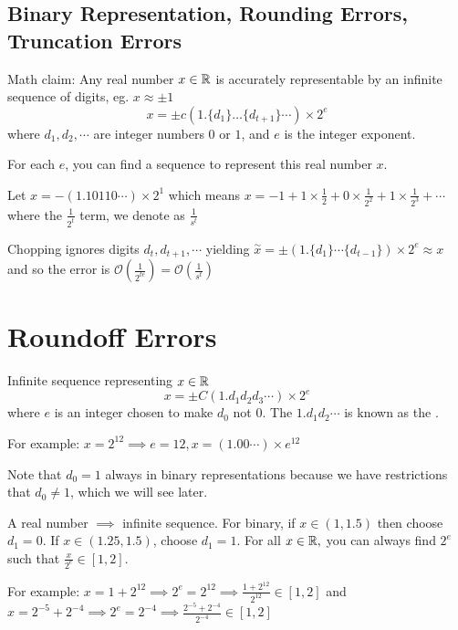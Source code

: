 \documentclass[12pt]{scrartcl}
\renewcommand{\O}{\mathcal{O}}
\begin{document}
\subsection{Binary Representation, Rounding Errors, Truncation Errors}

\begin{remark}
  Math claim: Any real number $x \in \mathbb R$ is accurately representable by an infinite sequence of digits, eg. $x \approx \pm 1$
  \[x = \pm c(1.\{d_1\}\ldots\{d_{t+1}\}\cdots) \times 2^e\]
  where $d_1, d_2, \cdots$ are integer numbers $0$ or $1$, and $e$ is the integer exponent.

  For each $e$, you can find a sequence to represent this real number $x$. 
\end{remark}

\begin{example}
  Let $x = -(1.10110\cdots) \times 2^1$ which means $x = -1 + 1 \times \frac{1}{2} + 0 \times \frac{1}{2^2} + 1 \times \frac{1}{2^3} + \cdots$
  where the $\frac{1}{2^t}$ term, we denote as $\frac{1}{s^t}$
\end{example}

\begin{definition}[Truncating]
  Chopping ignores digits $d_t, d_{t+1}, \cdots$ yielding $\overset{\sim}{x} = \pm (1.\{d_1\}\cdots\{d_{t-1}\}) \times 2^e \approx x$
  and so the error is $\O(\frac{1}{2^{te}}) = \O(\frac{1}{s^t})$
\end{definition}

\section{Roundoff Errors}

\begin{definition}
  Infinite sequence representing $x \in \mathbb R$
  \[x = \pm C(1.d_1 d_2 d_3 \cdots) \times 2^e\]
  where $e$ is an integer chosen to make $d_0$ not $0$. The $1.d_1d_2\cdots$ is known as the 
  .

  For example: $x = 2^{12} \implies e = 12, x = (1.00\cdots) \times e^{12}$
\end{definition}

\begin{note}
  Note that $d_0 = 1$ always in binary representations because we have restrictions that $d_0 \neq 1$, which we will see later.
\end{note}

\begin{note}
  A real number $\implies$ infinite sequence. For binary, if $x \in (1, 1.5)$ then choose 
  $d_1 = 0$. If $x \in (1.25, 1.5)$, choose $d_1 = 1$. For all $x \in \mathbb R,$ you can always find 
  $2^e$ such that $\frac{x}{2^e} \in [1, 2]$. 

  For example: $x = 1 + 2^{12} \implies 2^e = 2^{12} \implies \frac{1 + 2^{12}}{2^{12}} \in [1, 2]$ and 
  $x = 2^{-5} + 2^{-4} \implies 2^e = 2^{-4} \implies \frac{2^{-5} + 2^{-4}}{2^{-4}} \in [1, 2]$
\end{note}
\end{document}
